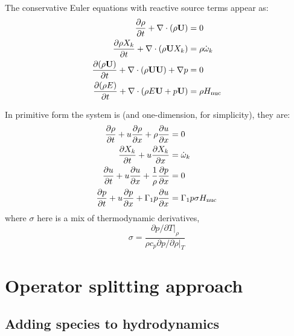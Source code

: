 The conservative Euler equations with reactive source terms
appear as:
\begin{align}
{\frac{{\partial\rho}}{\partial t}} + \nabla \cdot (\rho {\bf U}) &= 0 \\
{\frac{{\partial\rho X_k}}{\partial t}} + \nabla \cdot (\rho {\bf U} X_k) &= \rho {\dot{\omega}}_k \\
{\frac{{\partial(\rho {\bf U})}}{\partial t}} + \nabla \cdot (\rho {\bf U} {\bf U}) + \nabla p &= 0 \\
{\frac{{\partial(\rho E)}}{\partial t}} + \nabla \cdot (\rho E {\bf U} + p {\bf U} ) &= \rho {H_\mathrm{nuc}}
\end{align}

In primitive form the system is (and one-dimension, for simplicity),
they are:
\begin{align}
{\frac{{\partial\rho}}{\partial t}} + u {\frac{{\partial\rho}}{\partial x}} + \rho {\frac{{\partial u}}{\partial x}} &= 0\\
{\frac{{\partial X_k}}{\partial t}} + u {\frac{{\partial X_k}}{\partial x}} &= {\dot{\omega}}_k \\
{\frac{{\partial u}}{\partial t}} + u {\frac{{\partial u}}{\partial x}} + \frac{1}{\rho} {\frac{{\partial p}}{\partial x}} &= 0\\
{\frac{{\partial p}}{\partial t}} + u {\frac{{\partial p}}{\partial x}} + \Gamma_1 p {\frac{{\partial u}}{\partial x}} &= \Gamma_1 p \sigma {H_\mathrm{nuc}}
\end{align}
where $\sigma$ here is a mix of thermodynamic derivatives,
\begin{equation}
\sigma = \frac{\partial p / \partial T |_\rho}{\rho c_p \partial p / \partial \rho |_T}
\end{equation}


\section{Operator splitting approach}

\subsection{Adding species to hydrodynamics}

